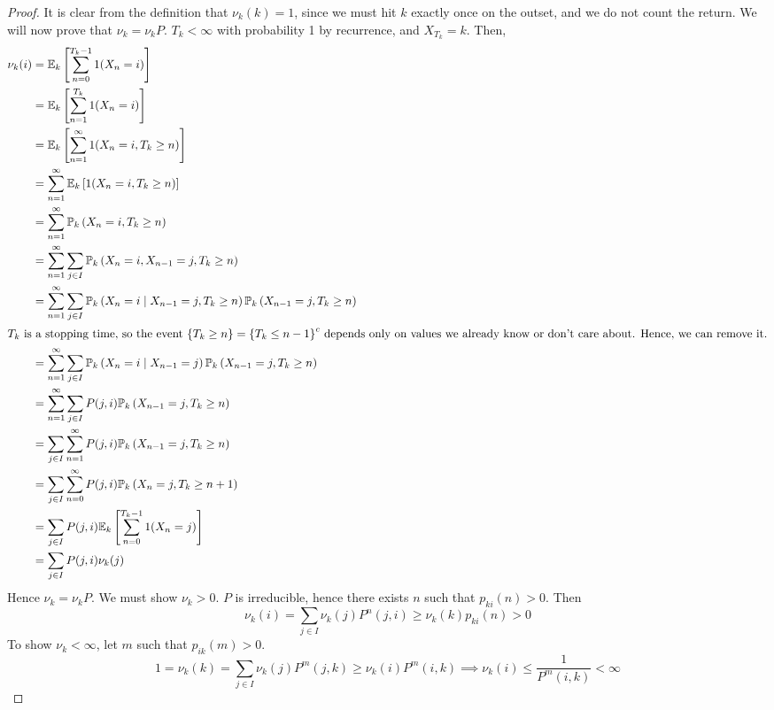 \begin{proof}
	It is clear from the definition that \( \nu_k(k) = 1 \), since we must hit \( k \) exactly once on the outset, and we do not count the return.
	We will now prove that \( \nu_k = \nu_k P \).
	\( T_k < \infty \) with probability 1 by recurrence, and \( X_{T_k} = k \).
	Then,
	\begin{align*}
		\nu_k(i) & = \mathbb{E}_{k}\left[{\sum_{n=0}^{T_k - 1} 1(X_n = i)}\right]                                                                         \\
		         & = \mathbb{E}_{k}\left[{\sum_{n=1}^{T_k} 1(X_n = i)}\right]                                                                             \\
		         & = \mathbb{E}_{k}\left[{\sum_{n=1}^\infty 1(X_n = i, T_k \geq n)}\right]                                                                \\
		         & = \sum_{n=1}^\infty \mathbb{E}_{k}\left[{1(X_n = i, T_k \geq n)}\right]                                                                \\
		         & = \sum_{n=1}^\infty \mathbb{P}_{k}\left({X_n = i, T_k \geq n}\right)                                                                   \\
		         & = \sum_{n=1}^\infty \sum_{j \in I} \mathbb{P}_{k}\left({X_n = i, X_{n-1} = j, T_k \geq n}\right)                                       \\
		         & = \sum_{n=1}^\infty \sum_{j \in I} \mathbb{P}_{k}\left({X_n = i \mid X_{n-1} = j, T_k \geq n}\right) \mathbb{P}_{k}\left({X_{n-1} = j, T_k \geq n}\right) \\
		\intertext{\( T_k \) is a stopping time, so the event \( \qty{T_k \geq n} = {\qty{T_k \leq n-1}}^c \) depends only on values we already know or don't care about.
			Hence, we can remove it.}
		         & = \sum_{n=1}^\infty \sum_{j \in I} \mathbb{P}_{k}\left({X_n = i \mid X_{n-1} = j}\right) \mathbb{P}_{k}\left({X_{n-1} = j, T_k \geq n}\right)             \\
		         & = \sum_{n=1}^\infty \sum_{j \in I} P(j, i) \mathbb{P}_{k}\left({X_{n-1} = j, T_k \geq n}\right)                                        \\
		         & = \sum_{j \in I} \sum_{n=1}^\infty P(j, i) \mathbb{P}_{k}\left({X_{n-1} = j, T_k \geq n}\right)                                        \\
		         & = \sum_{j \in I} \sum_{n=0}^\infty P(j, i) \mathbb{P}_{k}\left({X_n = j, T_k \geq n + 1}\right)                                        \\
		         & = \sum_{j \in I} P(j, i) \mathbb{E}_{k}\left[{\sum_{n=0}^{T_k - 1} 1(X_n = j)}\right]                                                  \\
		         & = \sum_{j \in I} P(j, i) \nu_k(j)
	\end{align*}
	Hence \( \nu_k = \nu_k P \).
	We must show \( \nu_k > 0 \).
	\( P \) is irreducible, hence there exists \( n \) such that \( p_{ki}(n) > 0 \).
	Then
	\[
		\nu_k(i) = \sum_{j \in I} \nu_k(j) P^n(j,i) \geq \nu_k(k) p_{ki}(n) > 0
	\]
	To show \( \nu_k < \infty \), let \( m \) such that \( p_{ik}(m) > 0 \).
	\[
		1 = \nu_k(k) = \sum_{j \in I} \nu_k(j) P^m(j,k) \geq \nu_k(i) P^m(i,k) \implies \nu_k(i) \leq \frac{1}{P^m(i,k)} < \infty
	\]
\end{proof}
